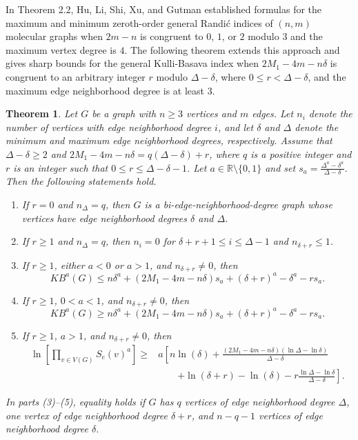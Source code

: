 \documentclass[10pt,a4paper]{amsart}
\newtheorem{theorem}{Theorem}[section]
\numberwithin{equation}{section}
\begin{document}
In Theorem 2.2, Hu, Li, Shi, Xu, and Gutman \cite{hu2005molecular} established formulas for the maximum and minimum zeroth-order general Randi\'{c} indices of $(n,m)$ molecular graphs when $2m-n$ is congruent to $0$, $1$, or $2$ modulo $3$ and the maximum vertex degree is $4$. The following theorem extends this approach and gives sharp bounds for the general Kulli-Basava index when $2M_1-4m-n\delta$ is congruent to an arbitrary integer $r$ modulo $\Delta-\delta$, where $0\leq r<\Delta-\delta$, and the maximum edge neighborhood degree is at least $3$.


\begin{theorem}\label{Theorem3}
Let $G$ be a graph with $n\geq 3$ vertices and $m$ edges. Let $n_i$ denote the number of vertices with edge neighborhood degree $i$, and let $\delta$ and $\Delta$ denote the minimum and maximum edge neighborhood degrees, respectively. Assume that $\Delta-\delta\geq2$ and $2M_1-4m-n\delta=q(\Delta-\delta)+r$, where $q$ is a positive integer and $r$ is an integer such that $0\leq r\leq\Delta-\delta-1$. Let $a\in\mathbb{R}\setminus\{0,1\}$ and set $s_a=\frac{\Delta^a-\delta^a}{\Delta-\delta}$. Then the following statements hold.

 \begin{enumerate}
\item If $r=0$ and $n_\Delta=q$, then $G$ is a bi-edge-neighborhood-degree graph whose vertices have edge neighborhood degrees $\delta$ and $\Delta$.

  \item If $r \geq 1$ and $n_{\Delta} = q$, then $n_i = 0$ for $\delta + r + 1 \leq i \leq \Delta  - 1$ and $n_{\delta + r} \leq 1$.

\item If $r\geq1$, either $a<0$ or $a>1$, and $n_{\delta+r}\neq0$, then
\[
KB^a(G)\leq n\delta^a+(2M_1-4m-n\delta)s_a+(\delta+r)^a-\delta^a-rs_a.
\]

\item If $r\geq1$, $0<a<1$, and $n_{\delta+r}\neq0$, then
\[
KB^a(G)\geq n\delta^a+(2M_1-4m-n\delta)s_a+(\delta+r)^a-\delta^a-rs_a.
\]

\item If $r\geq1$, $a>1$, and $n_{\delta+r}\neq0$, then
\[
\begin{aligned}
\ln\left[\prod_{v\in V(G)}S_e(v)^a\right]\geq
&a\left[n\ln(\delta)+\frac{(2M_1-4m-n\delta)(\ln\Delta-\ln\delta)}{\Delta-\delta}\right.\\
&\qquad\left.+\ln(\delta+r)-\ln(\delta)-r\frac{\ln\Delta-\ln\delta}{\Delta-\delta}\right].
\end{aligned}
\]
 \end{enumerate}
In parts (3)--(5), equality holds if $G$ has $q$ vertices of edge neighborhood degree $\Delta$, one vertex of edge neighborhood degree $\delta+r$, and $n-q-1$ vertices of edge neighborhood degree $\delta$.
 
\end{theorem}
\end{document}
